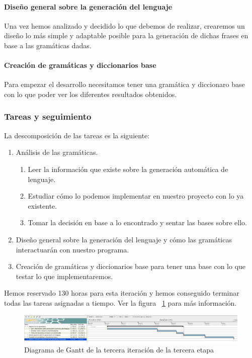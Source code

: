 \paragraph{Diseño general sobre la generación del lenguaje} Una vez hemos analizado y decidido lo que debemos de realizar, crearemos un diseño lo más simple y adaptable posible para la generación de dichas frases en base a las gramáticas dadas.

\paragraph{Creación de gramáticas y diccionarios base} Para empezar el desarrollo necesitamos tener una gramática y diccionaro base con lo que poder ver los diferentes resultados obtenidos.

\subsubsection{Tareas y seguimiento}

La descomposición de las tareas es la siguiente:

\begin{enumerate}[label=\bfseries WBS 3.\arabic*]
  \item Análisis de las gramáticas.
    \begin{enumerate}[label=\bfseries WBS 3.1.\arabic*]
      \item Leer la información que existe sobre la generación automática de lenguaje.
      \item Estudiar cómo lo podemos implementar en nuestro proyecto con lo ya existente.
      \item Tomar la decisión en base a lo encontrado y sentar las bases sobre ello.
    \end{enumerate}
  \item Diseño general sobre la generación del lenguaje y cómo las gramáticas interactuarán con nuestro programa.
  \item Creación de gramáticas y diccionarios base para tener una base con lo que testar lo que implementaremos.
\end{enumerate}

Hemos reservado 130 horas para esta iteración y hemos conseguido terminar todas las tareas asignadas a tiempo. Ver la figura ~\ref{fig:sec3it3} para más información.

\begin{figure}
    \includegraphics[width=\textwidth,height=\textheight,keepaspectratio]{./img/sec3it3.png}
  \caption{Diagrama de Gantt de la tercera iteración de la tercera etapa}
  \label{fig:sec3it3}
\end{figure}

